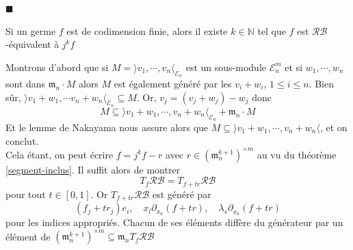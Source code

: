 \documentclass[memoire.tex]{subfiles}
\begin{document}
{\hfill\textcolor{color-prop}{$\blacksquare$}\par}



\begin{theorem}
    Si un germe $f$ est de codimension finie, alors il existe $k\in\mathbb{N}$ tel que $f$ est $\mathcal{RB}$-équivalent à 
    $j^k f$
\end{theorem}
\begin{preuve}
    Montrons d'abord que si $M=\rangle v_1,\cdots, v_n\langle _{\mathcal{E}_n}$ est un sous-module $\mathcal{E}_n^m$ et si $w_1,\cdots,w_n$ sont dans $\mathfrak{m}_n\cdot M$ alors $M$ est également généré par les $v_i+w_i$, $1\leq i\leq n$. Bien sûr, $\rangle v_1 +w_1,\cdots v_n +w_n \langle_{\mathcal{E}_n}\subseteq M$. Or, $v_j=(v_j+w_j)-w_j$ donc
    \begin{equation*}
        M\subseteq \rangle v_1+w_1,\cdots, v_n+w_n\langle_{\mathcal{E}_n}+\mathfrak{m}_n\cdot M
    \end{equation*}
    Et le lemme de Nakayama nous assure alors que $M\subseteq \rangle v_1+w_1,\cdots, v_n+w_n\langle$, et on conclut.\\
    Cela étant, on peut écrire $f=j^kf-r$ avec $r\in(\mathfrak{m}^{k+1}_n)^{\times m}$ au vu du théorème \ref{segment-inclus}. Il suffit alors de montrer
    \begin{equation*}
        T_{f}\mathcal{RB}=T_{f+tr}\mathcal{RB}
    \end{equation*}
    pour tout $t\in [0,1]$. Or $T_{f+tr}\mathcal{RB}$ est généré par 
    \begin{equation*}
        (f_j+tr_j)e_i,\quad x_l \partial_{x_a}(f+tr),\quad \lambda_s\partial_{x_a}(f+tr)
    \end{equation*}
    pour les indices appropriés. Chacun de ses éléments diffère du générateur par un élément de $(\mathfrak{m}^{k+1}_n)^{\times m}\subseteq \mathfrak{m}_n T_f\mathcal{RB}$
\end{preuve}
\end{document}
